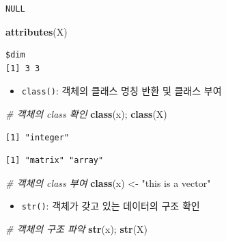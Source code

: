 \documentclass[
  11pt,
]{krantz}
\newenvironment{Shaded}{\begin{snugshade}}{\end{snugshade}}
\newcommand{\CommentTok}[1]{\textcolor[rgb]{0.37,0.37,0.37}{\textit{#1}}}
\newcommand{\KeywordTok}[1]{\textcolor[rgb]{0.27,0.27,0.27}{\textbf{#1}}}
\newcommand{\NormalTok}[1]{#1}
\newcommand{\StringTok}[1]{\textcolor[rgb]{0.5,0.5,0.5}{#1}}
\providecommand{\tightlist}{%
  \setlength{\itemsep}{0pt}\setlength{\parskip}{0pt}}
\begin{document}
\begin{verbatim}
NULL
\end{verbatim}

\begin{Shaded}
\begin{Highlighting}[]
\KeywordTok{attributes}\NormalTok{(X)}
\end{Highlighting}
\end{Shaded}

\begin{verbatim}
$dim
[1] 3 3
\end{verbatim}

\normalsize

\begin{itemize}
\tightlist
\item
  \texttt{class()}: 객체의 클래스 명칭 반환 및 클래스 부여
\end{itemize}

\footnotesize

\begin{Shaded}
\begin{Highlighting}[]
\CommentTok{# 객체의 class 확인}
\KeywordTok{class}\NormalTok{(x); }\KeywordTok{class}\NormalTok{(X)}
\end{Highlighting}
\end{Shaded}

\begin{verbatim}
[1] "integer"
\end{verbatim}

\begin{verbatim}
[1] "matrix" "array" 
\end{verbatim}

\begin{Shaded}
\begin{Highlighting}[]
\CommentTok{# 객체의 class 부여}
\KeywordTok{class}\NormalTok{(x) <-}\StringTok{ "this is a vector"}
\end{Highlighting}
\end{Shaded}

\normalsize

\begin{itemize}
\tightlist
\item
  \texttt{str()}: 객체가 갖고 있는 데이터의 구조 확인
\end{itemize}

\footnotesize

\begin{Shaded}
\begin{Highlighting}[]
\CommentTok{# 객체의 구조 파악}
\KeywordTok{str}\NormalTok{(x); }\KeywordTok{str}\NormalTok{(X)}
\end{Highlighting}
\end{Shaded}
\end{document}
